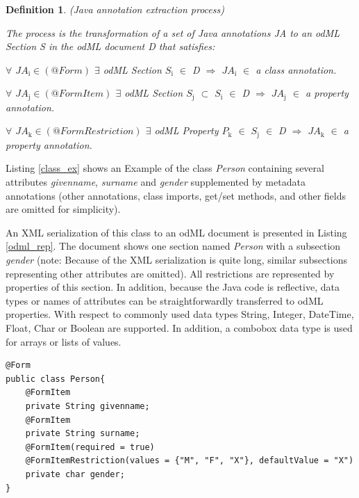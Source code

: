 \documentclass[conference]{IEEEtran}
\newtheorem{definition}{Definition}
\begin{document}
\begin{definition}
\label{def:Java_annotation_extraction_process}
(Java annotation extraction process)

\emph{The process is the transformation of a set of Java annotations JA to an odML Section S in the odML document D that satisfies:}

\emph{$\forall$ $JA{}_{\text{i}}\in {(@Form)}$ $\exists$ odML Section $S{}_{\text{i}}$ $\in$ D $\Rightarrow$ $JA{}_{\text{i}}$ $\in$ a class annotation}.

\emph{$\forall$ $JA{}_{\text{j}}\in {(@FormItem)}$ $\exists$ odML Section $S{}_{\text{j}}$ $\subset$ $S{}_{\text{i}}$ $\in$ D $\Rightarrow$ $JA{}_{\text{j}}$ $\in$ a property
annotation}.

\emph{$\forall$ $JA{}_{\text{k}}\in {(@FormRestriction)}$ $\exists$ odML Property $P{}_{\text{k}}$ $\in$ $S{}_{\text{j}}$ $\in$ D $\Rightarrow$ $JA{}_{\text{k}}$ $\in$ a property  annotation}.

\end{definition}

Listing \ref{class_ex} shows an Example of the class \textit{Person} containing several attributes \textit{givenname}, \textit{surname} and \textit{gender} supplemented by metadata annotations (other annotations, class imports, get/set methods, and other fields are omitted for simplicity).

An XML serialization of this class to an odML document is presented in Listing \ref{odml_rep}. The document shows one section named \textit{Person} with a subsection \textit{gender} (note: Because of the XML serialization is quite long, similar subsections representing other attributes are omitted). All restrictions are represented by properties of this section. In addition, because the Java code is reflective, data types or names of attributes can be straightforwardly transferred to odML properties. With respect to commonly used data types String, Integer, DateTime, Float, Char or Boolean are supported. In addition, a combobox data type is used for arrays or lists of values.


\scriptsize
\begin{lstlisting}[label=class_ex,caption=Java Class Example]
@Form
public class Person{
	@FormItem
	private String givenname;
	@FormItem
	private String surname;
	@FormItem(required = true)
	@FormItemRestriction(values = {"M", "F", "X"}, defaultValue = "X")
	private char gender;
}
\end{lstlisting}
\normalsize
\end{document}
